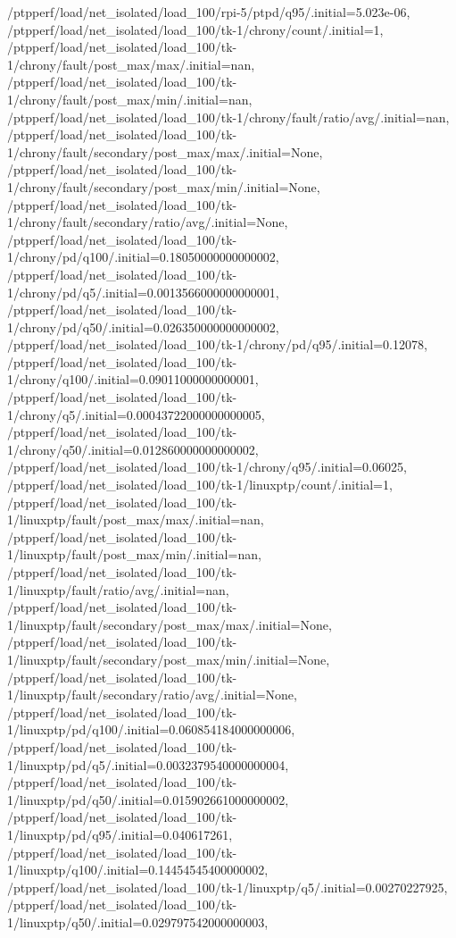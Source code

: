 {    /ptpperf/load/net_isolated/load_100/rpi-5/ptpd/q95/.initial=5.023e-06,
    /ptpperf/load/net_isolated/load_100/tk-1/chrony/count/.initial=1,
    /ptpperf/load/net_isolated/load_100/tk-1/chrony/fault/post_max/max/.initial=nan,
    /ptpperf/load/net_isolated/load_100/tk-1/chrony/fault/post_max/min/.initial=nan,
    /ptpperf/load/net_isolated/load_100/tk-1/chrony/fault/ratio/avg/.initial=nan,
    /ptpperf/load/net_isolated/load_100/tk-1/chrony/fault/secondary/post_max/max/.initial=None,
    /ptpperf/load/net_isolated/load_100/tk-1/chrony/fault/secondary/post_max/min/.initial=None,
    /ptpperf/load/net_isolated/load_100/tk-1/chrony/fault/secondary/ratio/avg/.initial=None,
    /ptpperf/load/net_isolated/load_100/tk-1/chrony/pd/q100/.initial=0.18050000000000002,
    /ptpperf/load/net_isolated/load_100/tk-1/chrony/pd/q5/.initial=0.0013566000000000001,
    /ptpperf/load/net_isolated/load_100/tk-1/chrony/pd/q50/.initial=0.026350000000000002,
    /ptpperf/load/net_isolated/load_100/tk-1/chrony/pd/q95/.initial=0.12078,
    /ptpperf/load/net_isolated/load_100/tk-1/chrony/q100/.initial=0.09011000000000001,
    /ptpperf/load/net_isolated/load_100/tk-1/chrony/q5/.initial=0.00043722000000000005,
    /ptpperf/load/net_isolated/load_100/tk-1/chrony/q50/.initial=0.012860000000000002,
    /ptpperf/load/net_isolated/load_100/tk-1/chrony/q95/.initial=0.06025,
    /ptpperf/load/net_isolated/load_100/tk-1/linuxptp/count/.initial=1,
    /ptpperf/load/net_isolated/load_100/tk-1/linuxptp/fault/post_max/max/.initial=nan,
    /ptpperf/load/net_isolated/load_100/tk-1/linuxptp/fault/post_max/min/.initial=nan,
    /ptpperf/load/net_isolated/load_100/tk-1/linuxptp/fault/ratio/avg/.initial=nan,
    /ptpperf/load/net_isolated/load_100/tk-1/linuxptp/fault/secondary/post_max/max/.initial=None,
    /ptpperf/load/net_isolated/load_100/tk-1/linuxptp/fault/secondary/post_max/min/.initial=None,
    /ptpperf/load/net_isolated/load_100/tk-1/linuxptp/fault/secondary/ratio/avg/.initial=None,
    /ptpperf/load/net_isolated/load_100/tk-1/linuxptp/pd/q100/.initial=0.060854184000000006,
    /ptpperf/load/net_isolated/load_100/tk-1/linuxptp/pd/q5/.initial=0.0032379540000000004,
    /ptpperf/load/net_isolated/load_100/tk-1/linuxptp/pd/q50/.initial=0.015902661000000002,
    /ptpperf/load/net_isolated/load_100/tk-1/linuxptp/pd/q95/.initial=0.040617261,
    /ptpperf/load/net_isolated/load_100/tk-1/linuxptp/q100/.initial=0.14454545400000002,
    /ptpperf/load/net_isolated/load_100/tk-1/linuxptp/q5/.initial=0.00270227925,
    /ptpperf/load/net_isolated/load_100/tk-1/linuxptp/q50/.initial=0.029797542000000003,
}
